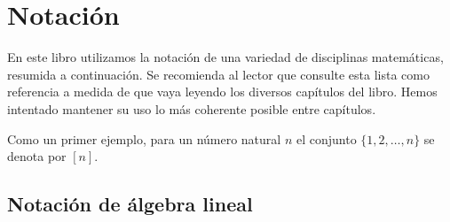 \documentclass[../book-main_es.tex]{subfiles}
\begin{document}
\chapter*{Notación}\label{ch:notation}

En este libro utilizamos la notación de una variedad de disciplinas matemáticas,
resumida a continuación. Se recomienda al lector que consulte esta lista como referencia a medida de que vaya leyendo los diversos capítulos del libro.
Hemos intentado mantener su uso lo más coherente posible entre capítulos.

Como un primer ejemplo, para un número natural \(n\) el conjunto 
\(\{1, 2, \dots, n\}\) se denota por \([n]\).

\section*{Notación de álgebra lineal}
\end{document}
